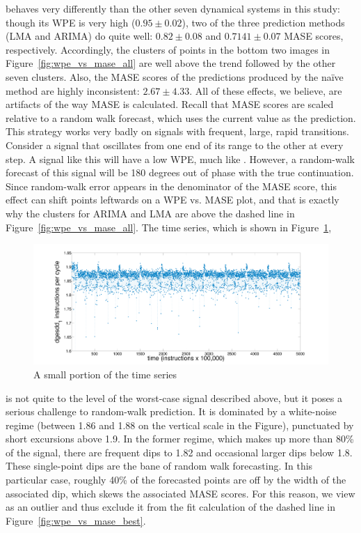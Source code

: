 \svdone behaves very differently than the other seven dynamical
systems in this study: though its WPE is very high ($0.95 \pm 0.02$),
two of the three prediction methods (LMA and ARIMA) do quite well:
$0.82 \pm 0.08$ and $0.7141 \pm 0.07$ MASE scores, respectively.
Accordingly, the clusters of \svdone points in the bottom two images
in Figure~\ref{fig:wpe_vs_mase_all} are well above the trend followed
by the other seven clusters.  Also, the MASE scores of the predictions
produced by the na\"ive method are highly inconsistent: $2.67 \pm
4.33$.  All of these effects, we believe, are artifacts of the way
MASE is calculated.  Recall that MASE scores are scaled relative to a
random walk forecast, which uses the current value as the prediction.
This strategy works very badly on signals with frequent, large, rapid
transitions.  Consider a signal that oscillates from one end of its
range to the other at every step.  A signal like this will have a low
WPE, much like \col.  However, a random-walk forecast of this signal
will be 180 degrees out of phase with the true continuation.  Since
random-walk error appears in the denominator of the MASE score, this
effect can shift points leftwards on a WPE vs. MASE plot, and that is
exactly why the \svdone clusters for ARIMA and LMA are above the
dashed line in Figure~\ref{fig:wpe_vs_mase_all}.  The \svdone time
series, which is shown in Figure~\ref{fig:svdone-ts},
\begin{figure}[htbp]
  \centering
    \includegraphics[width=\textwidth]{figs/svdonets2}
\caption{A small portion of the \svdone time series}\label{fig:svdone-ts}
\end{figure} 
is not quite to the level of the worst-case signal described above,
but it poses a serious challenge to random-walk prediction.  It is
dominated by a white-noise regime (between 1.86 and 1.88 on the
vertical scale in the Figure), punctuated by short excursions above
1.9.  In the former regime, which makes up more than 80\% of the
signal, there are frequent dips to 1.82 and occasional larger dips
below 1.8.  These single-point dips are the bane of random walk
forecasting.  In this particular case, roughly 40\% of the forecasted
points are off by the width of the associated dip, which skews the
associated MASE scores.  For this reason, we view \svdone as an
outlier and thus exclude it from the fit calculation of the dashed
line in Figure~\ref{fig:wpe_vs_mase_best}.


